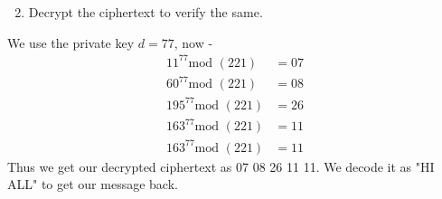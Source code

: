 \documentclass[xcolor=svgnames]{beamer}
\begin{document}
\begin{frame}{}
\begin{enumerate}\setcounter{enumi}{1}
        \item Decrypt the ciphertext to verify the same.
\end{enumerate}
    We use the private key $d = 77$, now - 
    \begin{align*}
        11 ^ {77}  \text{mod }(221) &= 07
        \\ 60 ^ {77}  \text{mod }(221) &= 08
        \\ 195 ^ {77} \text{mod }(221) &= 26
        \\ 163 ^ {77}  \text{mod }(221) &= 11
        \\ 163 ^ {77}  \text{mod }(221) &= 11
    \end{align*}    
    Thus we get our decrypted ciphertext as 07 08 26 11 11. We decode it as "HI ALL" to get our message back.
\end{frame}
\end{document}
